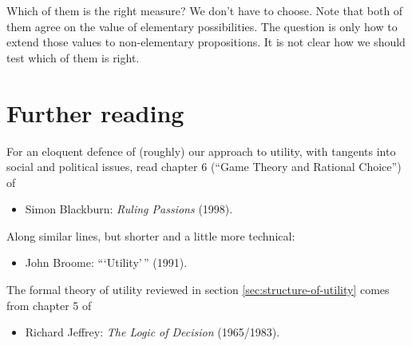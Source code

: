 {Which of them is the right measure? We don't have to choose. Note that
both of them agree on the value of elementary possibilities. The
question is only how to extend those values to non-elementary
propositions. It is not clear how we should test which of them is
right.

} %


\section{Further reading}

For an eloquent defence of (roughly) our approach to utility, with
tangents into social and political issues, read chapter 6 (``Game
Theory and Rational Choice'') of
%
\begin{itemize}
  \item Simon Blackburn: \emph{Ruling Passions} (1998).
\end{itemize}
%
Along similar lines, but shorter and a little more technical:
%
\begin{itemize}
  \item John Broome: ```Utility'\,'' (1991).
\end{itemize}

The formal theory of utility reviewed in section
\ref{sec:structure-of-utility} comes from chapter 5 of
%
\begin{itemize}
  \item Richard Jeffrey: \emph{The Logic of Decision} (1965/1983).
\end{itemize}


